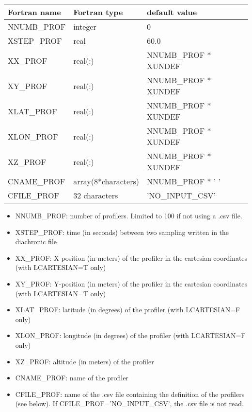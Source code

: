 \vspace{0.5cm}
\begin{longtable} {|p{}|p{}|p{}|}
\hline
Fortran name &  Fortran type & default value \\
\hline
\endhead
\hline
\endfoot
NNUMB\_PROF    & integer &  0 \\
XSTEP\_PROF    & real  &  60.0 \\
XX\_PROF       & real(:)  &  NNUMB\_PROF * XUNDEF \\
XY\_PROF       & real(:)  &  NNUMB\_PROF * XUNDEF  \\
XLAT\_PROF     & real(:)  &  NNUMB\_PROF * XUNDEF \\
XLON\_PROF     & real(:)  &  NNUMB\_PROF * XUNDEF \\
XZ\_PROF       & real(:)  &  NNUMB\_PROF * XUNDEF \\
CNAME\_PROF    & array(8*characters)  &  NNUMB\_PROF * ' ' \\
CFILE\_PROF    & 32 characters  &  'NO\_INPUT\_CSV' \\
\end{longtable}
\begin{itemize}
\item NNUMB\_PROF: number of profilers. Limited to 100 if not using a .csv file.

\item XSTEP\_PROF: time (in seconds) between two sampling written in the diachronic file

\item XX\_PROF: X-position (in meters) of the profiler in the cartesian coordinates (with LCARTESIAN=T only)

\item XY\_PROF: Y-position (in meters) of the profiler in the cartesian coordinates (with LCARTESIAN=T only)

\item XLAT\_PROF: latitude (in degrees) of the profiler (with LCARTESIAN=F only)

\item XLON\_PROF: longitude (in degrees) of the profiler (with LCARTESIAN=F only)

\item XZ\_PROF: altitude (in meters) of the profiler

\item CNAME\_PROF: name of the profiler

\item CFILE\_PROF: name of the .csv file containing the definition of the profilers (see below). If CFILE\_PROF='NO\_INPUT\_CSV', the .csv file is not read.

\end{itemize}

